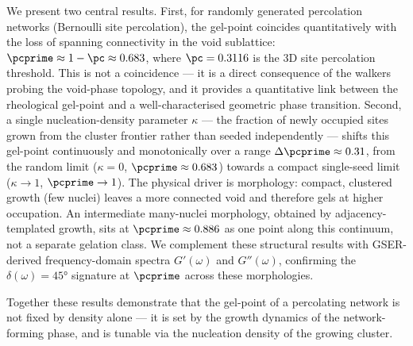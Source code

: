 We present two central results. First, for randomly generated percolation networks (Bernoulli site percolation), the gel-point coincides quantitatively with the loss of spanning connectivity in the void sublattice: $\pcprime \approx 1 - \pc \approx 0.683$, where $\pc = 0.3116$ is the 3D site percolation threshold. This is not a coincidence — it is a direct consequence of the walkers probing the void-phase topology, and it provides a quantitative link between the rheological gel-point and a well-characterised geometric phase transition. Second, a single nucleation-density parameter $\kappa$ — the fraction of newly occupied sites grown from the cluster frontier rather than seeded independently — shifts this gel-point continuously and monotonically over a range $\Delta\pcprime \approx 0.31$, from the random limit ($\kappa = 0$, $\pcprime \approx 0.683$) towards a compact single-seed limit ($\kappa \to 1$, $\pcprime \to 1$). The physical driver is morphology: compact, clustered growth (few nuclei) leaves a more connected void and therefore gels at higher occupation. An intermediate many-nuclei morphology, obtained by adjacency-templated growth, sits at $\pcprime \approx 0.886$ as one point along this continuum, not a separate gelation class. We complement these structural results with GSER-derived frequency-domain spectra $G'(\omega)$ and $G''(\omega)$, confirming the $\delta(\omega) = 45°$ signature at $\pcprime$ across these morphologies.

Together these results demonstrate that the gel-point of a percolating network is not fixed by density alone — it is set by the growth dynamics of the network-forming phase, and is tunable via the nucleation density of the growing cluster.

